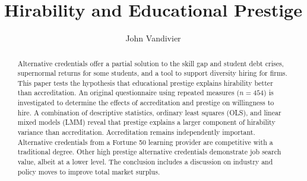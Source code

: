 \documentclass[review]{elsarticle}
\begin{document}
\begin{frontmatter}

    \title{
        Hirability and Educational Prestige
    }

    \author[mymainaddress]{John Vandivier}
    \address[mymainaddress]{4400 University Dr, Fairfax, VA 22030}

    \begin{abstract}
        Alternative credentials
        offer a partial solution to the skill gap and student debt crises,
        supernormal returns for some students,
        and a tool to support diversity hiring for firms.
        This paper tests the hypothesis that educational prestige explains hirability
        better than accreditation.
        An original questionnaire using repeated measures ($n = 454$)
        is investigated to determine the effects of accreditation and prestige on willingness to hire.
        A combination of descriptive statistics, ordinary least squares (OLS), and linear mixed models (LMM)
        reveal that prestige explains a larger component of hirability variance than accreditation.
        Accreditation remains independently important.
        Alternative credentials from a Fortune 50 learning provider are competitive with a traditional degree.
        Other high prestige alternative credentials demonstrate job search value, albeit at a lower level.
        The conclusion includes a discussion on industry and policy moves to improve total market surplus.
    \end{abstract}


\end{frontmatter}
\end{document}
